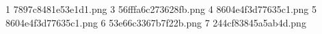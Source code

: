 1 7897c8481e53e1d1.png
3 56fffa6c273628fb.png
4 8604e4f3d77635c1.png
5 8604e4f3d77635c1.png
6 53e66c3367b7f22b.png
7 244cf83845a5ab4d.png
